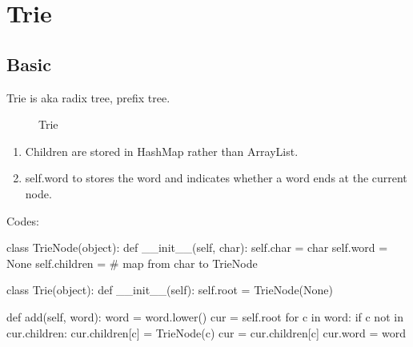 \newpage
\section{Trie}
\subsection{Basic}
Trie is aka radix tree, prefix tree. 
\begin{figure}[hbtp]
\centering
{}
\caption{Trie}
\label{fig:trie} 
\end{figure}
\begin{enumerate}
\item Children are stored in HashMap rather than ArrayList. 
\item self.word to stores the word and indicates whether a word ends at the current
node. 
\end{enumerate}
Codes:
\begin{python}
class TrieNode(object):
    def __init__(self, char):
        self.char = char
        self.word = None
        self.children = {}  # map from char to TrieNode


class Trie(object):
    def __init__(self):
        self.root = TrieNode(None)

    def add(self, word):
        word = word.lower()
        cur = self.root
        for c in word:
            if c not in cur.children:
                cur.children[c] = TrieNode(c)
            cur = cur.children[c]
        cur.word = word
\end{python}

